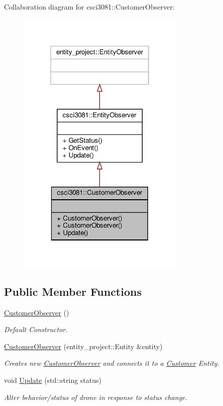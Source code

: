 Collaboration diagram for csci3081\+:\+:Customer\+Observer\+:
\nopagebreak
\begin{figure}[H]
\begin{center}
\leavevmode
\includegraphics[width=226pt]{classcsci3081_1_1CustomerObserver__coll__graph}
\end{center}
\end{figure}
\subsection*{Public Member Functions}
\begin{DoxyCompactItemize}
\item 
\mbox{\label{classcsci3081_1_1CustomerObserver_aef8825b1f43910c5080691d57ac2979b}} 
\hyperlink{classcsci3081_1_1CustomerObserver_aef8825b1f43910c5080691d57ac2979b}{Customer\+Observer} ()
\begin{DoxyCompactList}\small\item\em Default Constructor. \end{DoxyCompactList}\item 
\hyperlink{classcsci3081_1_1CustomerObserver_aa6c907db0939e504ffabfaa0a619702e}{Customer\+Observer} (entity\+\_\+project\+::\+Entity \&entity)
\begin{DoxyCompactList}\small\item\em Creates new \hyperlink{classcsci3081_1_1CustomerObserver}{Customer\+Observer} and connects it to a \hyperlink{classcsci3081_1_1Customer}{Customer} Entity. \end{DoxyCompactList}\item 
void \hyperlink{classcsci3081_1_1CustomerObserver_a2134ac33a6fd38951bbd979e6fd5a853}{Update} (std\+::string status)
\begin{DoxyCompactList}\small\item\em Alter behavior/status of drone in response to status change. \end{DoxyCompactList}\end{DoxyCompactItemize}


